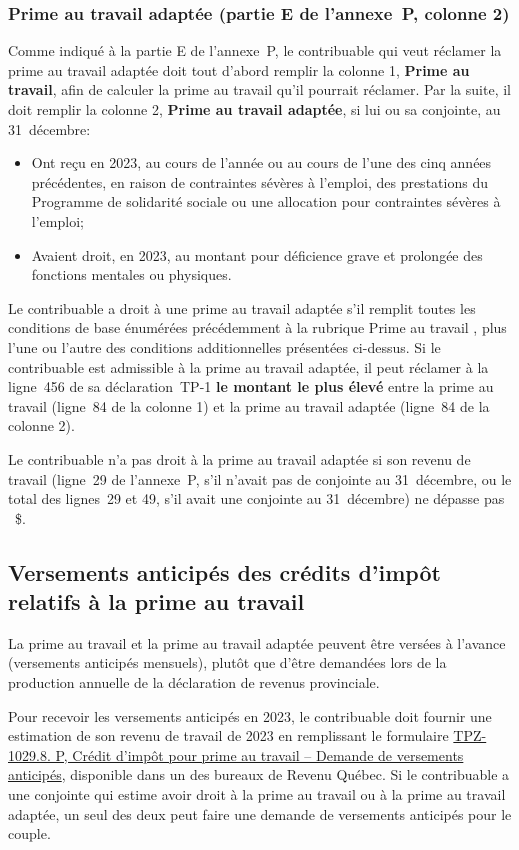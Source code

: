 \subsubsection{Prime au travail adaptée (partie E de l'annexe~P, colonne 2)}
Comme indiqué à la partie E de l'annexe~P, le contribuable qui veut réclamer la prime au travail adaptée doit tout d'abord remplir la colonne 1, \textbf{Prime au travail}, afin de calculer la prime au travail qu'il pourrait réclamer. Par la suite, il doit remplir la colonne 2, \textbf{Prime au travail adaptée}, si lui ou sa conjointe, au 31~décembre:
\begin{itemize}
	\item Ont reçu en 2023, au cours de l'année ou au cours de l'une des cinq années précédentes, en raison de contraintes sévères à l'emploi, des prestations du Programme de solidarité sociale ou une allocation pour contraintes sévères à l'emploi;
	\item Avaient droit, en 2023, au montant pour déficience grave et prolongée des fonctions mentales ou physiques.
\end{itemize}

Le contribuable a droit à une prime au travail adaptée s'il remplit toutes les conditions de base énumérées précédemment à la rubrique \og Prime au travail \fg{}, plus l'une ou l'autre des conditions additionnelles présentées ci-dessus. Si le contribuable est admissible à la prime au travail adaptée, il peut réclamer à la ligne~456 de sa déclaration~TP-1 \textbf{le montant le plus élevé} entre la prime au travail (ligne~84 de la colonne 1) et la prime au travail adaptée (ligne~84 de la colonne 2).

Le contribuable n'a pas droit à la prime au travail adaptée si son revenu de travail (ligne~29 de l'annexe~P, s'il n'avait pas de conjointe au 31~décembre, ou le total des lignes~29 et 49, s'il avait une conjointe au 31~décembre) ne dépasse pas ~\$.


\subsection{Versements anticipés des crédits d'impôt relatifs à la prime au travail}
La prime au travail et la prime au travail adaptée peuvent être versées à l'avance (versements anticipés mensuels), plutôt que d'être demandées lors de la production annuelle de la déclaration de revenus provinciale.

Pour recevoir les versements anticipés en 2023, le contribuable doit fournir une estimation de son revenu de travail de 2023 en remplissant le formulaire \href{https://www.revenuquebec.ca/documents/fr/formulaires/tpz/TPZ-1029.8.P(2023-10).pdf}{TPZ-1029.8. P, Crédit d'impôt pour prime au travail – Demande de versements anticipés}, disponible dans un des bureaux de Revenu Québec. Si le contribuable a une conjointe qui estime avoir droit à la prime au travail ou à la prime au travail adaptée, un seul des deux peut faire une demande de versements anticipés pour le couple.

